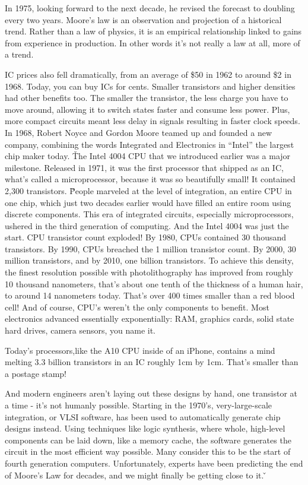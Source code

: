 In 1975, looking forward to the next decade, he revised the forecast to doubling every two years. Moore's law is an
observation and projection of a historical trend. Rather than a law of physics, it is an empirical relationship
linked to gains from experience in production. In other words it's not really a law at all, more of a trend.


IC prices also fell dramatically, from an average of \$50 in 1962 to around \$2 in 1968. Today, you can buy ICs for
cents. Smaller transistors and higher densities had other benefits too. The smaller the transistor, the less charge
you have to move around, allowing it to switch states faster and consume less power. Plus, more compact circuits
meant less delay in signals resulting in faster clock speeds. In 1968, Robert Noyce and Gordon Moore teamed up and
founded a new company, combining the words Integrated and Electronics in ``Intel'' the largest chip maker today. \v

The Intel 4004 CPU that we introduced earlier was a major milestone. Released in 1971, it was the first processor
that shipped as an IC, what's called a microprocessor, because it was so beautifully small! It contained 2,300
transistors. \v

People marveled at the level of integration, an entire CPU in one chip, which just two decades earlier would have
filled an entire room using discrete components. This era of integrated circuits, especially microprocessors, ushered
in the third generation of computing. And the Intel 4004 was just the start. CPU transistor count exploded! By 1980,
CPUs contained 30 thousand transistors. By 1990, CPUs breached the 1 million transistor count. By 2000, 30 million
transistors, and by 2010, one billion transistors. To achieve this density, the finest resolution possible with
photolithography has improved from roughly 10 thousand nanometers, that's about one tenth of the thickness of a human
hair, to around 14 nanometers today. That's over 400 times smaller than a red blood cell! And of course, CPU's
weren't the only components to benefit. Most electronics advanced essentially exponentially: RAM, graphics cards,
solid state hard drives, camera sensors, you name it.

\be
Today's processors,like the A10 CPU inside of an iPhone, contains a mind melting 3.3 billion transistors in an IC
roughly 1cm by 1cm. That's smaller than a postage stamp!
\ee

And modern engineers aren't laying out these designs by hand, one transistor at a time - it's not humanly possible.
Starting in the 1970's, very-large-scale integration, or VLSI software, has been used to automatically generate chip
designs instead. Using techniques like logic synthesis, where whole, high-level components can be laid down, like a
memory cache, the software generates the circuit in the most efficient way possible. Many consider this to be the
start of fourth generation computers. Unfortunately, experts have been predicting the end of Moore's Law for decades,
and we might finally be getting close to it. \v


